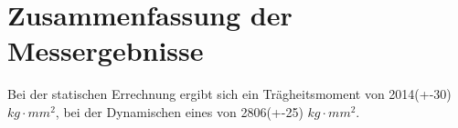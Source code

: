 \section{Zusammenfassung der Messergebnisse}
Bei der statischen Errechnung ergibt sich ein Trägheitsmoment von 2014(+-30) $kg\cdot mm^{2}$, bei der Dynamischen eines von 2806(+-25) $kg\cdot mm^{2}$.